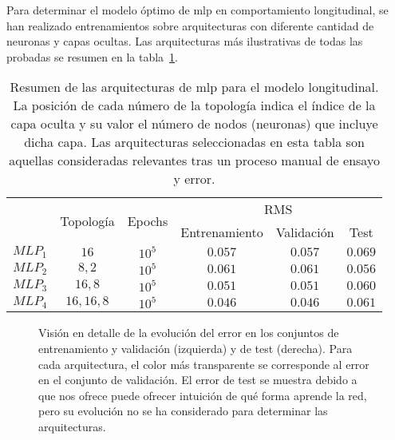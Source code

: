 Para determinar el modelo óptimo de \ac{mlp} en comportamiento longitudinal, se han realizado entrenamientos sobre arquitecturas con diferente cantidad de neuronas y capas ocultas. Las arquitecturas más ilustrativas de todas las probadas se resumen en la tabla~\ref{tbl:cf-mlp-architectures}.

\begin{table}
	\centering
	\caption[Resumen de las arquitecturas \ac{mlp} para el modelo longitudinal]{Resumen de las arquitecturas de \ac{mlp} para el modelo longitudinal. La posición de cada número de la topología indica el índice de la capa oculta y su valor el número de nodos (neuronas) que incluye dicha capa. Las arquitecturas seleccionadas en esta tabla son aquellas consideradas relevantes tras un proceso manual de ensayo y error.}
	\label{tbl:cf-mlp-architectures}
	\begin{tabular}{cccccc}
		\toprule
		\multirow{2}{*}{} & \multirow{2}{*}{Topología} & \multirow{2}{*}{Epochs} & \multicolumn{3}{c}{RMS} \\
		& & & Entrenamiento & Validación & Test \\
		\midrule
		\rowcolor{black!20} $MLP_1$ & $16$        & $10^5$ & $0.057$ & $0.057$ & $0.069$  \\
		$MLP_2$ & $8, 2$      & $10^5$ & $0.061$ & $0.061$ & $0.056$  \\
		\rowcolor{black!20} $MLP_3$ & $16, 8$     & $10^5$ & $0.051$ & $0.051$ & $0.060$  \\
		$MLP_4$ & $16, 16, 8$ & $10^5$ & $0.046$ & $0.046$ & $0.061$  \\
		\bottomrule
	\end{tabular}
\end{table}

\begin{figure}[!b]
	\centering
	\qquad
	\caption[Evolución del error durante el entrenamiento en las arquitecturas de \ac{mlp} para el modelo longitudinal]{Visión en detalle de la evolución del error en los conjuntos de entrenamiento y validación (izquierda) y de test (derecha). Para cada arquitectura, el color más transparente se corresponde al error en el conjunto de validación. El error de test se muestra debido a que nos ofrece puede ofrecer intuición de qué forma aprende la red, pero su evolución no se ha considerado para determinar las arquitecturas.}
	\label{fig:lm-mlp-rmse-all-comparisons}
\end{figure}

